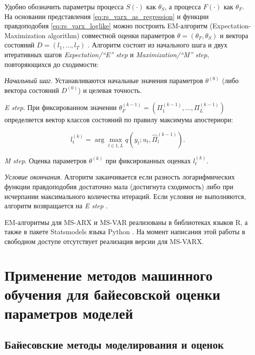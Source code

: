 \documentclass[a4paper,14pt]{extreport}
\begin{document}
Удобно обозначить параметры процесса $S(\cdot)$ как $\theta_S$, а процесса $F(\cdot)$ как $\theta_F$. На основании представления \eqref{eq:rs_varx_as_regression} и функции правдоподобия \eqref{eq:rs_varx_loglike} можно построить EM-алгоритм (Expectation-Maximization algorithm) совместной оценки параметров $\theta = (\theta_F, \theta_S)$ и вектора состояний $D = (l_1, \dots, l_T)$ \cite{malNovopMSVARX}. Алгоритм состоит из начального шага и двух итеративных шагов \textit{Expectation/``E''  step} и \textit{Maximization/``M'' step}, повторяющихся до сходимости:

\textit{Начальный шаг}. Устанавливаются начальные значения параметров $\theta^{(0)}$ (либо вектора состояний $D^{(0)}$) и целевая точность.

\textit{E step}. При фиксированном значении $\theta_F^{(k-1)}  = (\Pi_1^{(k-1)}, \dots, \Pi_L^{(k-1)})$ определяется вектор классов состояний по правилу максимума апостериори: 

\begin{equation}
	l_t^{(k)} = \arg\max_{l\in\overline{1,L}}
	q(y_t; u_t, \hat{\Pi}_{l}^{(k-1)}) .
\end{equation}

\textit{M step}. Оценка параметров $\theta^{(k)}$ при фиксированных оценках $l_t^{(k)}$.

\textit{Условие окончания}. Алгоритм заканчивается если разность логарифмических функции правдоподобия достаточно мала (достигнута сходимость) либо при исчерпании максимального количества итераций. Если условия не выполняются, алгоритм возвращается на \textit{E step} \cite{malNovopMSVARX,malVARforCycles}.

EM-алгоритмы для MS-ARX и MS-VAR реализованы в библиотеках языков R, а также в пакете Statsmodels языка Python \cite{statsmodels}. На момент написания этой работы в свободном доступе отсутствует реализация версии для MS-VARX.


\chapter{Применение методов машинного обучения для байесовской оценки параметров моделей}

\label{chapter:ml_methods}

\section{Байесовские методы моделирования и оценок}

\label{section:bayes_methods}
\end{document}
